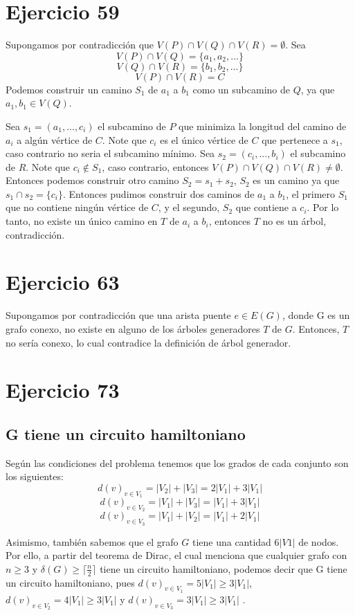 \documentclass{article}
\begin{document}
	\section{Ejercicio 59}
	Supongamos por contradicción que $V(P) \cap V(Q) \cap V(R) = \emptyset$. 
	Sea $$V(P) \cap V(Q) = \{a_1, a_2, ...\}$$ $$V(Q) \cap V(R) = \{b_1, b_2, ...\}$$$$V(P) \cap V(R) = C$$
	Podemos construir un camino $S_1$ de $a_1$ a $b_1$ como un subcamino de $Q$, ya que $a_1, b_1 \in V(Q)$.
	
	Sea $s_1 = (a_1, ..., c_i)$ el subcamino de $P$ que minimiza la longitud del camino de $a_i$ a algún vértice de $C$. Note que $c_i$ es el único vértice de $C$ que pertenece a $s_1$, caso contrario no seria el subcamino mínimo. Sea $s_2 = (c_i, ..., b_i)$ el subcamino de $R$. Note que $c_i \notin S_1$, caso contrario, entonces $V(P) \cap V(Q) \cap V(R) \neq \emptyset$. Entonces podemos construir otro camino $S_2 = s_1 + s_2$, $S_2$ es un camino ya que $s_1 \cap s_2 = \{c_i\}$. Entonces pudimos construir dos caminos de $a_1$ a $b_1$, el primero $S_1$ que no contiene ningún vértice de $C$, y el segundo, $S_2$ que contiene a $c_i$. Por lo tanto, no existe un único camino en $T$ de $a_i$ a $b_i$, entonces $T$ no es un árbol, contradicción.
	
	
	\section{Ejercicio 63}
	
	Supongamos por contradicción que una arista puente $e \in E(G)$, donde G es un grafo conexo, no existe en alguno de los árboles generadores $T$ de $G$. Entonces, $T$ no sería conexo, lo cual contradice la definición de árbol generador.
	
	
	
	\section{Ejercicio 73}
	\subsection{G tiene un circuito hamiltoniano}
	Según las condiciones del problema tenemos que los grados de cada conjunto son los siguientes: 
	$$ d(v)_{v \in V_1} = |V_2| + |V_3| = 2|V_1| + 3|V_1|$$
	$$ d(v)_{v \in V_2} = |V_1| + |V_3| = |V_1| + 3|V_1| $$
	$$ d(v)_{v \in V_3} = |V_1| + |V_2| = |V_1| + 2|V_1| $$
	
	Asimismo, también sabemos que el grafo $G$ tiene una cantidad $6|V1|$ de nodos. Por ello, a partir del teorema de Dirac, el cual menciona que cualquier grafo con $n \geq 3 $ y $\delta(G) \geq \lceil \frac{n}{2} \rceil $ tiene un circuito hamiltoniano, podemos decir que G tiene un circuito hamiltoniano, pues $d(v)_{v \in V_1} = 5|V_1| \geq 3|V_1|$, $d(v)_{v \in V_2} = 4|V_1| \geq 3|V_1|$ y $d(v)_{v \in V_3} = 3|V_1| \geq 3|V_1|$ . 
	
\end{document}

